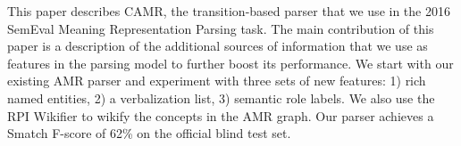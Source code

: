 This paper describes CAMR, the transition-based parser that we use in the 2016 SemEval Meaning Representation Parsing task. The main contribution of this paper is a description of the additional sources of information that we use as features in the parsing model to further boost its performance. We start with our existing AMR parser and experiment with three sets of new features: 1) rich named entities, 2) a verbalization list, 3) semantic role labels. We also use the RPI Wikifier to wikify the concepts in the AMR graph. Our parser achieves a Smatch F-score of 62\% on the official blind test set.
